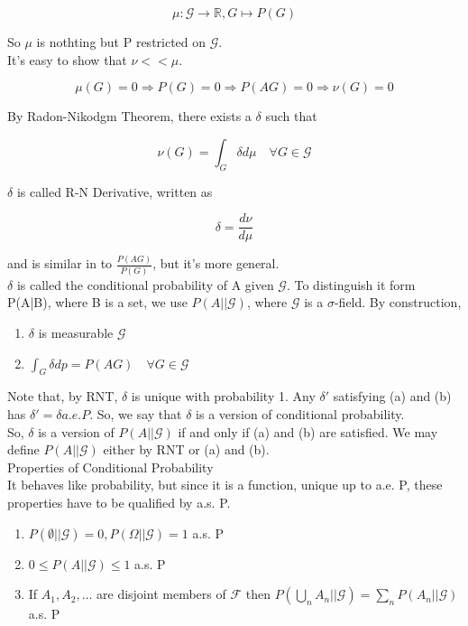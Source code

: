\documentclass[11pt,fleqn]{book} %
\begin{document}
\begin{enumerate}
			$$\mu: \mathcal{G} \rightarrow \mathbb{R}, G \mapsto P(G) $$

	So $\mu$ is nothting but P restricted on $\mathcal{G}$.\\

	It's easy to show that $\nu << \mu$. 

			$$\mu(G) = 0 \Rightarrow P(G) = 0 \Rightarrow P(AG) = 0 \Rightarrow \nu(G) = 0$$

		By Radon-Nikodgm Theorem, there exists a $\delta$ such that

			$$\nu(G) = \int_G \delta d\mu \quad \forall G \in \mathcal{G} $$

		$\delta$ is called R-N Derivative, written as 

				$$\delta = \frac{d\nu}{d\mu} $$

		and is similar in  to $\frac{P(AG)}{P(G)}$, but it's more general. \\

		$\delta$ is called the conditional probability of A given $\mathcal{G}$. To distinguish it form P(A|B), where B is a set, we use $P(A||\mathcal{G})$, where $\mathcal{G}$ is a $\sigma$-field. By construction, \\

				\begin{enumerate}
					\item $\delta$ is measurable $\mathcal{G}$
					\item $\int_G \delta dp = P(AG) \quad \forall G\in\mathcal{G}$ \\
				\end{enumerate}


		Note that, by RNT, $\delta$ is unique with probability 1. Any $\delta'$ satisfying (a) and (b) has $\delta' = \delta a.e. P$. So, we say that $\delta$ is a version of conditional probability. \\

		So, $\delta$ is a version of $P(A||\mathcal{G})$ if and only if (a) and (b) are satisfied. We may define $P(A||\mathcal{G})$ either by RNT or (a) and (b). \\


		Properties of Conditional Probability\\

		It behaves like probability, but since it is a function, unique up to a.e. P, these properties have to be qualified by a.s. P.

		\begin{enumerate}	
			\item $P(\emptyset || \mathcal{G}) = 0, P(\Omega||\mathcal{G}) = 1$ a.s. P
			\item $0 \leq P(A|| \mathcal{G}) \leq 1$ a.s. P
			\item If $A_1, A_2, \dots$ are disjoint members of $\mathcal{F}$ then $P(\bigcup_n A_n || \mathcal{G}) = \sum_n P(A_n || \mathcal{G})$ a.s. P
		\end{enumerate}


\end{enumerate}
\end{document}
